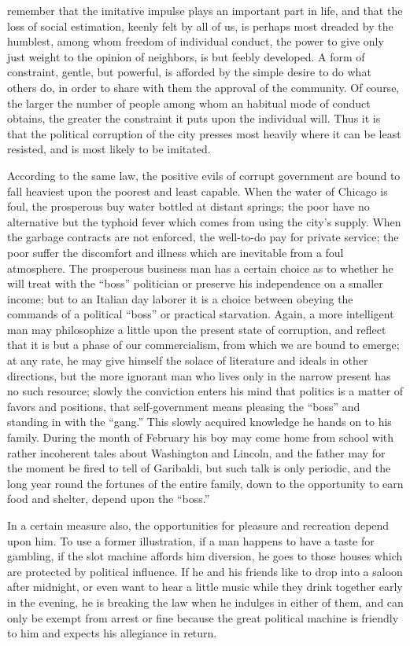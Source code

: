 \documentclass[]{article}
\begin{document}
\begin{sectionbody}
remember that the imitative impulse plays an important part in life, and
that the loss of social estimation, keenly felt by all of us, is perhaps
most dreaded by the humblest, among whom freedom of individual conduct,
the power to give only just weight to the opinion of neighbors, is but
feebly developed. A form of constraint, gentle, but powerful, is
afforded by the simple desire to do what others do, in order to share
with them the approval of the community. Of course, the larger the
number of people among whom an habitual mode of conduct obtains, the
greater the constraint it puts upon the individual will. Thus it is that
the political corruption of the city presses most heavily where it can
be least resisted, and is most likely to be imitated.

\addamsparagraph According to the same law, the positive evils of corrupt government are
bound to fall heaviest upon the poorest and least capable. When the
water of Chicago is foul, the prosperous buy water bottled at distant
springs; the poor have no alternative but the typhoid fever which comes
from using the city's supply. When the garbage contracts are not
enforced, the well-to-do pay for private service; the poor suffer the
discomfort and illness which are inevitable from a foul atmosphere. The
prosperous business man has a certain choice as to whether he will treat
with the ``boss'' politician or preserve his independence on a smaller
income; but to an Italian day laborer it is a choice between obeying the
commands of a political ``boss'' or practical starvation. Again, a more
intelligent man may philosophize a little upon the present state of
corruption, and reflect that it is but a phase of our commercialism,
from which we are bound to emerge; at any rate, he may give himself the
solace of literature and ideals in other directions, but the more
ignorant man who lives only in the narrow present has no such resource;
slowly the conviction enters his mind that politics is a matter of
favors and positions, that self-government means pleasing the ``boss'' and
standing in with the ``gang.'' This slowly acquired knowledge he hands on
to his family. During the month of February his boy may come home from
school with rather incoherent tales about Washington and Lincoln, and
the father may for the moment be fired to tell of Garibaldi, but such
talk is only periodic, and the long year round the fortunes of the
entire family, down to the opportunity to earn food and shelter, depend
upon the ``boss.''

\addamsparagraph In a certain measure also, the opportunities for pleasure and recreation
depend upon him. To use a former illustration, if a man happens to have
a taste for gambling, if the slot machine affords him diversion, he goes
to those houses which are protected by political influence. If he and
his friends like to drop into a saloon after midnight, or even want to
hear a little music while they drink together early in the evening, he
is breaking the law when he indulges in either of them, and can only be
exempt from arrest or fine because the great political machine is
friendly to him and expects his allegiance in return.


\end{sectionbody}
\end{document}
